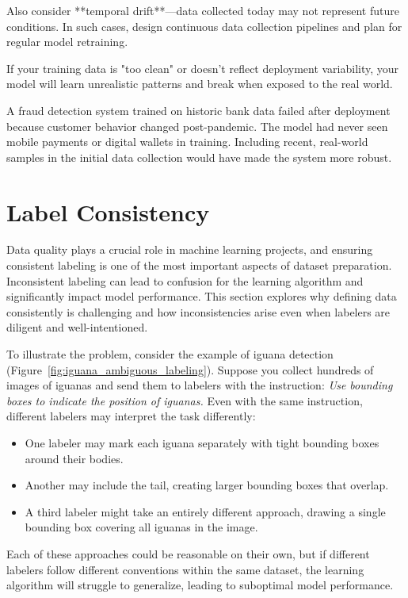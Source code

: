 \documentclass[12pt,openany]{book}
\begin{document}
Also consider **temporal drift**—data collected today may not represent future conditions. In such cases, design continuous data collection pipelines and plan for regular model retraining.

If your training data is "too clean" or doesn't reflect deployment variability, your model will learn unrealistic patterns and break when exposed to the real world.

\begin{examplebox}
A fraud detection system trained on historic bank data failed after deployment because customer behavior changed post-pandemic. The model had never seen mobile payments or digital wallets in training. Including recent, real-world samples in the initial data collection would have made the system more robust.
\end{examplebox}



\section{Label Consistency}

Data quality plays a crucial role in machine learning projects, and ensuring consistent labeling is one of the most important aspects of dataset preparation. Inconsistent labeling can lead to confusion for the learning algorithm and significantly impact model performance. This section explores why defining data consistently is challenging and how inconsistencies arise even when labelers are diligent and well-intentioned. \newline

To illustrate the problem, consider the example of iguana detection (Figure~\ref{fig:iguana_ambiguous_labeling}). Suppose you collect hundreds of images of iguanas and send them to labelers with the instruction: \textit{Use bounding boxes to indicate the position of iguanas.} Even with the same instruction, different labelers may interpret the task differently:
\begin{itemize}
    \item One labeler may mark each iguana separately with tight bounding boxes around their bodies.
    \item Another may include the tail, creating larger bounding boxes that overlap.
    \item A third labeler might take an entirely different approach, drawing a single bounding box covering all iguanas in the image.
\end{itemize}
Each of these approaches could be reasonable on their own, but if different labelers follow different conventions within the same dataset, the learning algorithm will struggle to generalize, leading to suboptimal model performance.
\end{document}
